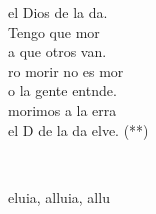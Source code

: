 \documentclass[12pt]{article}
\begin{document}
\begin{multicols*}{2}
\begin{cancion}
\begin{chorus}
	 el Dios de la da.\\
	Tengo que mor\\
	a que otros van.\\
	ro morir no es mor\\
	o la gente entnde.\\
	morimos a la erra\\
	el D de la da elve. (**)\\
	\end{chorus}%
	\jump\\
\end{cancion}%

\begin{cancion}[Alleluia 7][Taizé]%
	eluia, alluia, allu  \\
\end{cancion}%


\end{multicols*}
\end{document}
